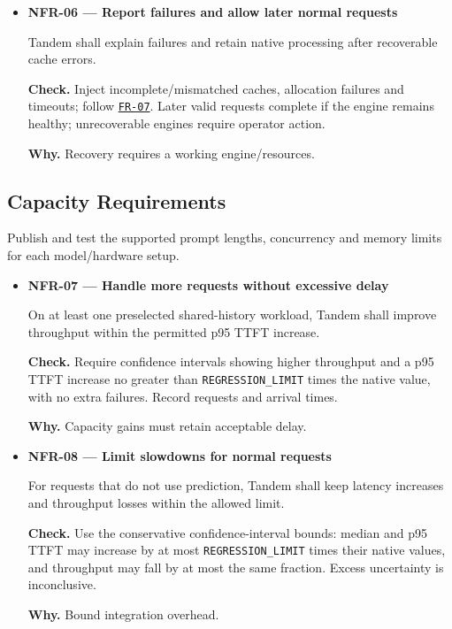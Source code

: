 \documentclass[12pt]{article}
\begin{document}
\begin{itemize}
\item {}\label{req:NFR-06}
\textbf{NFR-06 --- Report failures and allow later normal requests}\par
Tandem shall explain failures and retain native processing after recoverable cache errors.\par
\textbf{Check.} Inject incomplete/mismatched caches, allocation failures and timeouts; follow \hyperref[req:FR-07]{\texttt{FR-07}}. Later valid requests complete if the engine remains healthy; unrecoverable engines require operator action.\par
\textbf{Why.} Recovery requires a working engine/resources.
\end{itemize}

\subsection{Capacity Requirements}
Publish and test the supported prompt lengths, concurrency and memory limits for each model/hardware setup.

\begin{itemize}
\item {}\label{req:NFR-07}
\textbf{NFR-07 --- Handle more requests without excessive delay}\par
On at least one preselected shared-history workload, Tandem shall improve throughput within the permitted p95 TTFT increase.\par
\textbf{Check.} Require confidence intervals showing higher throughput and a p95 TTFT increase no greater than \texttt{REGRESSION\_LIMIT} times the native value, with no extra failures. Record requests and arrival times.\par
\textbf{Why.} Capacity gains must retain acceptable delay.


\item {}\label{req:NFR-08}
\textbf{NFR-08 --- Limit slowdowns for normal requests}\par
For requests that do not use prediction, Tandem shall keep latency increases and throughput losses within the allowed limit.\par
\textbf{Check.} Use the conservative confidence-interval bounds: median and p95 TTFT may increase by at most \texttt{REGRESSION\_LIMIT} times their native values, and throughput may fall by at most the same fraction. Excess uncertainty is inconclusive.\par
\textbf{Why.} Bound integration overhead.
\end{itemize}
\end{document}
